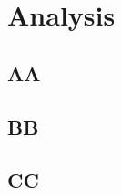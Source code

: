 \chapter{Analysis}

\lipsum[2]

\section{AA}
\lipsum[2]

\section{BB}
\lipsum[2]

\section{CC}
\lipsum[2]
